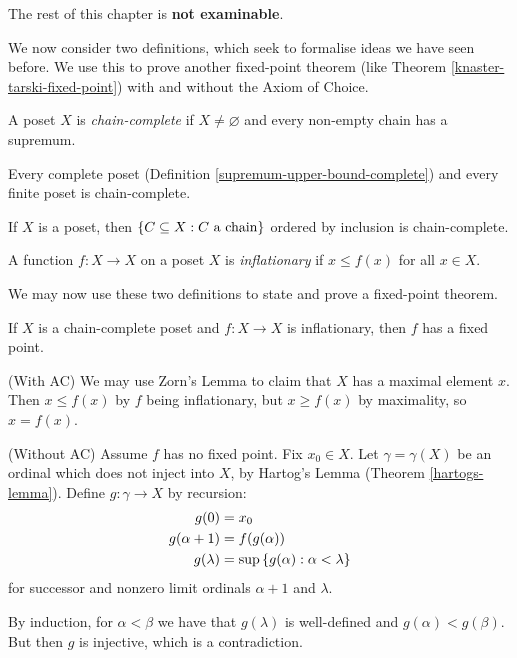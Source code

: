 \documentclass{article}
\begin{document}
\begin{note}
	The rest of this chapter is \textbf{not examinable}.
\end{note}

We now consider two definitions, which seek to formalise ideas we have seen before. We use this to prove another fixed-point theorem (like Theorem \ref{knaster-tarski-fixed-point}) with and without the Axiom of Choice.

\begin{definition}
    A poset $X$ is \textit{chain-complete} if $X \neq \varnothing$ and every non-empty chain has a supremum.
\end{definition}

\begin{corollary}
    Every complete poset (Definition \ref{supremum-upper-bound-complete}) and every finite poset is chain-complete.
\end{corollary}

\begin{corollary}
    If $X$ is a poset, then $\left\lbrace C \subseteq X: C \text{ a chain} \right\rbrace$ ordered by inclusion is chain-complete.
\end{corollary}

\begin{definition}[Inflationary]
    A function $f: X \to X$ on a poset $X$ is \textit{inflationary} if $x \leq f(x)$ for all $x \in X$.
\end{definition}

We may now use these two definitions to state and prove a fixed-point theorem.

\begin{theorem}
    If $X$ is a chain-complete poset and $f : X \to X$ is inflationary, then $f$ has a fixed point.
\end{theorem}

\begin{prf}
    (With AC) We may use Zorn's Lemma to claim that $X$ has a maximal element $x$. Then $x \leq f(x)$ by $f$ being inflationary, but $x \geq f(x)$ by maximality, so $x = f(x)$.
\end{prf}

\begin{prf}
    (Without AC) Assume $f$ has no fixed point. Fix $x_0 \in X$. Let $\gamma = \gamma(X)$ be an ordinal which does not inject into $X$, by Hartog's Lemma (Theorem \ref{hartogs-lemma}). Define $g : \gamma \to X$ by recursion:
	\begin{align*}
    	g(0) &= x_0 \\
    	g(\alpha + 1) &= f(g(\alpha)) \\
    	g(\lambda) &= \sup \left\lbrace g(\alpha) : \alpha < \lambda \right\rbrace
	\end{align*}
	for successor and nonzero limit ordinals $\alpha+1$ and $\lambda$.
	
	By induction, for $\alpha < \beta$ we have that $g(\lambda)$ is well-defined and $g(\alpha) < g(\beta)$. But then $g$ is injective, which is a contradiction.
\end{prf}
\end{document}
